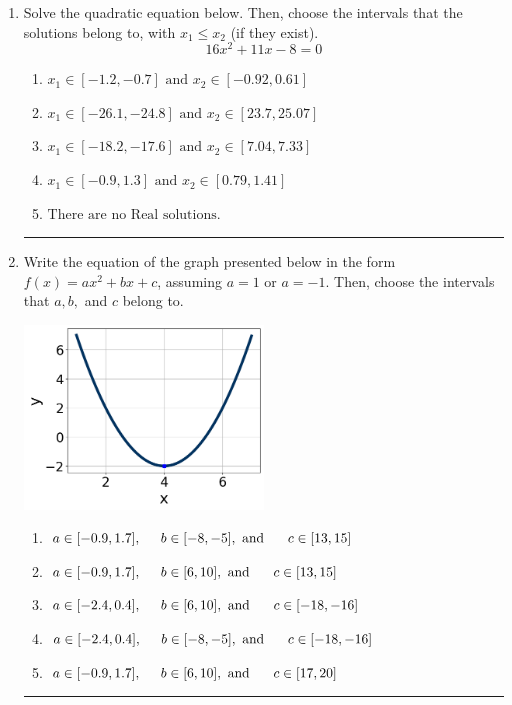 \documentclass[14pt]{extbook}
\newcommand{\litem}[1]{\item#1\hspace*{-1cm}\rule{\textwidth}{0.4pt}}
\begin{document}
\begin{enumerate}
{\begin{enumerate}[label=\Alph*.]
\end{enumerate} }
\litem{
Solve the quadratic equation below. Then, choose the intervals that the solutions belong to, with $x_1 \leq x_2$ (if they exist).\[ 16x^{2} +11 x -8 = 0 \]\begin{enumerate}[label=\Alph*.]
\item \( x_1 \in [-1.2, -0.7] \text{ and } x_2 \in [-0.92, 0.61] \)
\item \( x_1 \in [-26.1, -24.8] \text{ and } x_2 \in [23.7, 25.07] \)
\item \( x_1 \in [-18.2, -17.6] \text{ and } x_2 \in [7.04, 7.33] \)
\item \( x_1 \in [-0.9, 1.3] \text{ and } x_2 \in [0.79, 1.41] \)
\item \( \text{There are no Real solutions.} \)

\end{enumerate} }
\litem{
Write the equation of the graph presented below in the form $f(x)=ax^2+bx+c$, assuming  $a=1$ or $a=-1$. Then, choose the intervals that $a, b,$ and $c$ belong to.
\begin{center}
    \includegraphics[width=0.5\textwidth]{../Figures/quadraticGraphToEquationCopyA.png}
\end{center}
\begin{enumerate}[label=\Alph*.]
\item \( a \in [-0.9, 1.7], \hspace*{5mm} b \in [-8, -5], \text{ and } \hspace*{5mm} c \in [13, 15] \)
\item \( a \in [-0.9, 1.7], \hspace*{5mm} b \in [6, 10], \text{ and } \hspace*{5mm} c \in [13, 15] \)
\item \( a \in [-2.4, 0.4], \hspace*{5mm} b \in [6, 10], \text{ and } \hspace*{5mm} c \in [-18, -16] \)
\item \( a \in [-2.4, 0.4], \hspace*{5mm} b \in [-8, -5], \text{ and } \hspace*{5mm} c \in [-18, -16] \)
\item \( a \in [-0.9, 1.7], \hspace*{5mm} b \in [6, 10], \text{ and } \hspace*{5mm} c \in [17, 20] \)


\end{enumerate}}
\end{enumerate}
\end{document}
